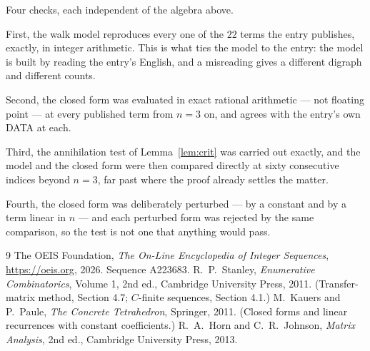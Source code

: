 \documentclass[11pt,a4paper]{article}
\theoremstyle{plain}
\theoremstyle{definition}
\begin{document}
Four checks, each independent of the algebra above.

First, the walk model reproduces every one of the $22$ terms the entry publishes,
exactly, in integer arithmetic. This is what ties the model to the entry: the model is built
by reading the entry's English, and a misreading gives a different digraph and different
counts.

Second, the closed form was evaluated in exact rational arithmetic --- not floating point ---
at every published term from $n=3$ on, and agrees with the entry's own DATA at each.

Third, the annihilation test of Lemma~\ref{lem:crit} was carried out exactly, and the model
and the closed form were then compared directly at sixty consecutive indices beyond
$n=3$, far past where the proof already settles the matter.

Fourth, the closed form was deliberately perturbed --- by a constant and by a term linear in
$n$ --- and each perturbed form was rejected by the same comparison, so the test is not one
that anything would pass.

\begin{thebibliography}{9}
 The OEIS Foundation, \emph{The On-Line Encyclopedia of Integer
Sequences}, \url{https://oeis.org}, 2026. Sequence A223683.
 R.~P.~Stanley, \emph{Enumerative Combinatorics}, Volume 1, 2nd ed.,
Cambridge University Press, 2011. (Transfer-matrix method, Section 4.7; $C$-finite sequences,
Section 4.1.)
 M.~Kauers and P.~Paule, \emph{The Concrete Tetrahedron}, Springer, 2011.
(Closed forms and linear recurrences with constant coefficients.)
 R.~A.~Horn and C.~R.~Johnson, \emph{Matrix Analysis}, 2nd ed., Cambridge
University Press, 2013.
\end{thebibliography}
\end{document}

